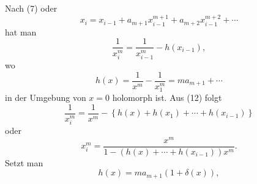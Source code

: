 Nach (7) oder
\begin{equation}
x_i=x_{i-1}+a_{m+1}x_{i-1}^{m+1}+a_{m+2}x_{i-1}^{m+2}+\cdots\tag*{(7)$'$}
\end{equation}
\noindent hat man
\begin{equation}
\frac1{x_i^m}=\frac1{x_{i-1}^m}-h(x_{i-1}),\tag*{(12)}
\end{equation}
\noindent wo
\begin{equation}
h(x)=\frac1{x^m}-\frac1{x_1^m}=ma_{m+1}+\cdots\tag*{(13)}
\end{equation}
\noindent in der Umgebung von \(x=0\) holomorph ist. Aus (12) folgt
\[
\frac1{x_i^m}=\frac1{x^m}-\left\{h(x)+h(x_1)+\cdots+h(x_{i-1})\right\}
\]
\noindent oder
\begin{equation}
x_i^m=\frac{x^m}{1-(h(x)+\cdots+h(x_{i-1}))x^m}.\tag*{(14)}
\end{equation}
\noindent Setzt man
\begin{equation}
h(x)=ma_{m+1}(1+\delta(x)),\tag*{(15)}
\end{equation}
\par\endgroup

